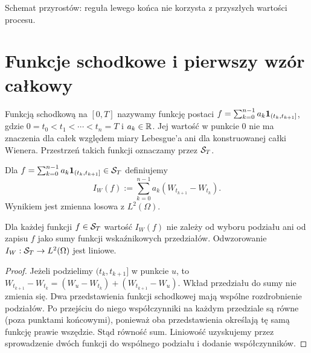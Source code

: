 \begin{center}
\par\smallskip\small Schemat przyrostów: reguła lewego końca nie korzysta z przyszłych wartości procesu.
\end{center}

\section{Funkcje schodkowe i pierwszy wzór całkowy}
\begin{definicja}
Funkcją schodkową na $[0,T]$ nazywamy funkcję postaci
$f=\sum_{k=0}^{n-1}a_k\mathbf{1}_{(t_k,t_{k+1}]}$, gdzie
$0=t_0<t_1<\cdots<t_n=T$ i $a_k\in\mathbb{R}$.
Jej wartość w punkcie $0$ nie ma znaczenia dla całek względem
miary Lebesgue'a ani dla konstruowanej całki Wienera.
Przestrzeń takich funkcji oznaczamy przez $\mathcal{S}_T$.
\end{definicja}

\begin{definicja}
Dla $f=\sum_{k=0}^{n-1}a_k\mathbf{1}_{(t_k,t_{k+1}]}\in\mathcal{S}_T$
definiujemy
\[
I_W(f):=\sum_{k=0}^{n-1}a_k(W_{t_{k+1}}-W_{t_k}).
\tag{1.1}\label{eq:wiener-simple}
\]
Wynikiem jest zmienna losowa z $L^2(\Omega)$.
\end{definicja}

\begin{lemat}
Dla każdej funkcji $f\in\mathcal{S}_T$ wartość $I_W(f)$
nie zależy od wyboru podziału ani od zapisu $f$ jako sumy
funkcji wskaźnikowych przedziałów. Odwzorowanie
$I_W:\mathcal{S}_T\to L^2(\Omega)$ jest liniowe.
\end{lemat}
\begin{proof}
Jeżeli podzielimy $(t_k,t_{k+1}]$ w punkcie $u$, to
$W_{t_{k+1}}-W_{t_k}=(W_u-W_{t_k})+(W_{t_{k+1}}-W_u)$.
Wkład przedziału do sumy nie zmienia się. Dwa przedstawienia
funkcji schodkowej mają wspólne rozdrobnienie podziałów.
Po przejściu do niego współczynniki na każdym przedziale są
równe (poza punktami końcowymi), ponieważ oba przedstawienia
określają tę samą funkcję prawie wszędzie. Stąd równość sum.
Liniowość uzyskujemy przez sprowadzenie dwóch funkcji do
wspólnego podziału i dodanie współczynników.
\end{proof}


